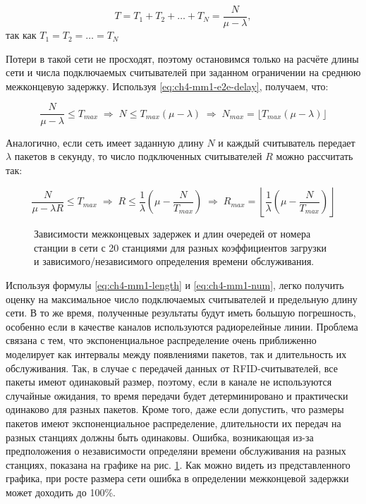 \begin{equation}
	\label{eq:ch4-mm1-e2e-delay}
	T = T_1 + T_2 + \dots + T_N = \frac{N}{\mu - \lambda},
\end{equation}
так как $T_1 = T_2 = \dots = T_N$

Потери в такой сети не просходят, поэтому остановимся только на расчёте длины сети и числа подключаемых считывателей при заданном ограничении на среднюю межконцевую задержку. Используя \eqref{eq:ch4-mm1-e2e-delay}, получаем, что:

\begin{equation}
	\label{eq:ch4-mm1-length}
	\frac{N}{\mu - \lambda} \leqslant T_{max} \; \Rightarrow \; N \leqslant T_{max}(\mu - \lambda) \; \Rightarrow \; N_{max} = \lfloor T_{max}(\mu - \lambda) \rfloor
\end{equation}

Аналогично, если сеть имеет заданную длину $N$ и каждый считыватель передает $\lambda$ пакетов в секунду, то число подключенных считывателей $R$ можно рассчитать так:

\begin{equation}
	\label{eq:ch4-mm1-num}
	\frac{N}{\mu - \lambda R} \leqslant T_{max} \; \Rightarrow \; R \leqslant \frac{1}{\lambda}(\mu - \frac{N}{T_{max}}) \; \Rightarrow \; R_{max} = \left\lfloor \frac{1}{\lambda}(\mu - \frac{N}{T_{max}}) \right\rfloor
\end{equation}

\begin{figure}[htb]
  \caption{Зависимости межконцевых задержек и длин очередей от номера станции в сети с 20 станциями для разных коэффициентов загрузки и зависимого/независимого определения времени обслуживания.}
  \label{fig:ch4_mm1_delays}
\end{figure}

Используя формулы \eqref{eq:ch4-mm1-length} и \eqref{eq:ch4-mm1-num}, легко получить оценку на максимальное число подключаемых считывателей и предельную длину сети. В то же время, полученные результаты будут иметь большую погрешность, особенно если в качестве каналов используются радиорелейные линии. Проблема связана с тем, что экспоненциальное распределение очень приближенно моделирует как интервалы между появлениями пакетов, так и длительность их обслуживания. Так, в случае с передачей данных от RFID-считывателей, все пакеты имеют одинаковый размер, поэтому, если в канале не используются случайные ожидания, то время передачи будет детерминировано и практически одинаково для разных пакетов. Кроме того, даже если допустить, что размеры пакетов имеют экспоненциальное распределение, длительности их передач на разных станциях должны быть одинаковы. Ошибка, возникающая из-за предположения о независимости определяни времени обслуживания на разных станциях, показана на графике на рис. \ref{fig:ch4_mm1_delays}. Как можно видеть из представленного графика, при росте размера сети ошибка в определении межконцевой задержки может доходить до 100\%.

